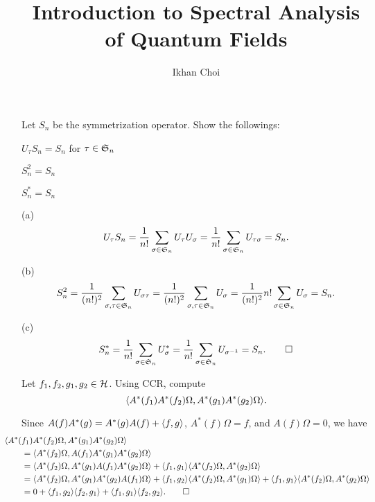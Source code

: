 \documentclass{../../../small}
\begin{document}
\title{Introduction to Spectral Analysis of Quantum Fields}
\author{Ikhan Choi}
\maketitle

\renewcommand{\theprb}{\arabic{prb}}
\setcounter{prb}{104}


\begin{prb}
Let $S_n$ be the symmetrization operator.
Show the followings:
\begin{parts}
\item $U_\tau S_n=S_n$ for $\tau\in\mathfrak{S}_n$
\item $S_n^2=S_n$
\item $S_n^*=S_n$
\end{parts}
\end{prb}
\begin{sol}
(a)
\[U_\tau S_n=\frac1{n!}\sum_{\sigma\in\mathfrak{S}_n}U_\tau U_\sigma=\frac1{n!}\sum_{\sigma\in\mathfrak{S}_n}U_{\tau\sigma}=S_n.\]

(b)
\[S_n^2=\frac1{(n!)^2}\sum_{\sigma,\tau\in\mathfrak{S}_n}U_{\sigma\tau}=\frac1{(n!)^2}\sum_{\sigma,\tau\in\mathfrak{S}_n}U_{\sigma}=\frac1{(n!)^2}n!\sum_{\sigma\in\mathfrak{S}_n}U_{\sigma}=S_n.\]

(c)
\[S_n^*=\frac1{n!}\sum_{\sigma\in\mathfrak{S}_n}U_\sigma^*=\frac1{n!}\sum_{\sigma\in\mathfrak{S}_n}U_{\sigma^{-1}}=S_n.\qedhere\]
\end{sol}

\begin{prb}
Let $f_1,f_2,g_1,g_2\in\mathcal{H}$.
Using CCR, compute
\[\langle A^*(f_1)A^*(f_2)\Omega,A^*(g_1)A^*(g_2)\Omega\rangle.\]
\end{prb}
\begin{sol}
Since $A(f)A^*(g)=A^*(g)A(f)+\langle f,g\rangle$, $A^*(f)\Omega=f$, and $A(f)\Omega=0$, we have
\begin{align*}
&\hspace{-2em}\<A^*(f_1)A^*(f_2)\Omega,A^*(g_1)A^*(g_2)\Omega\>\\
&=\<A^*(f_2)\Omega,A(f_1)A^*(g_1)A^*(g_2)\Omega\>\\
&=\<A^*(f_2)\Omega,A^*(g_1)A(f_1)A^*(g_2)\Omega\>+\<f_1,g_1\>\<A^*(f_2)\Omega,A^*(g_2)\Omega\>\\
&=\<A^*(f_2)\Omega,A^*(g_1)A^*(g_2)A(f_1)\Omega\>+\<f_1,g_2\>\<A^*(f_2)\Omega,A^*(g_1)\Omega\>+\<f_1,g_1\>\<A^*(f_2)\Omega,A^*(g_2)\Omega\>\\
&=0+\<f_1,g_2\>\<f_2,g_1\>+\<f_1,g_1\>\<f_2,g_2\>.\qedhere
\end{align*}
\end{sol}
\end{document}
